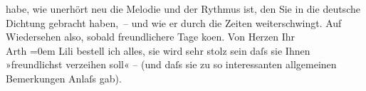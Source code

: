 \begin{ledgroupsized}[t]{13cm}
               habe, wie unerhört neu die Melodie und der Rythmus ist, den Sie in die deutsche
               Dichtung gebracht haben, – und wie er durch die Zeiten weiterschwingt.\pend
           \pstart
           Auf Wiedersehen also, sobald freundlichere Tage ko{\geminationm}en.\pend
           \pstart
           Von Herzen Ihr{\\[\baselineskip]}\spacefill\mbox{Arth}\pend
           \leftskip=0em{}\pstart
           \noindent{}Lili bestell ich alles, sie wird sehr stolz
                  sein daſs sie Ihnen »freundlichst verzeihen soll« – (und daſs sie zu so
                  interessanten allgemeinen Bemerkungen Anlaſs gab).\pend
           
         
         \endnumbering{}\end{ledgroupsized}  \newcommand{\dateiname}{L02467}\newcommand{\titel}{Arthur Schnitzler an Hugo Hofmannsthal, 11. 3. 1926}\newcommand{\editorInnen}{Martin Anton Müller und Gerd-Hermann Susen}
      